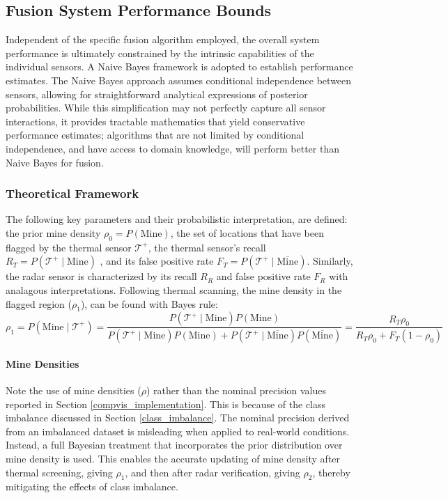 \subsection{Fusion System Performance Bounds}\label{fusion_bounds}

    Independent of the specific fusion algorithm employed, the overall system performance is ultimately constrained by the intrinsic capabilities of the individual sensors. A Naive Bayes framework is adopted to establish performance estimates. The Naive Bayes approach assumes conditional independence between sensors, allowing for straightforward analytical expressions of posterior probabilities. While this simplification may not perfectly capture all sensor interactions, it provides tractable mathematics that yield conservative performance estimates; algorithms that are not limited by conditional independence, and have access to domain knowledge, will perform better than Naive Bayes for fusion.

    \subsubsection{Theoretical Framework}
        
        The following key parameters and their probabilistic interpretation, are defined: the prior mine density $\rho_0 = P(\text{Mine})$, the set of locations that have been flagged by the thermal sensor \(\mathcal{T}^+\), the thermal sensor's recall $R_T = P(\mathcal{T}^+\mid\text{Mine})$ , and its false positive rate $F_T = P(\mathcal{T}^+ \mid \overline{\text{Mine}})$. Similarly, the radar sensor is characterized by its recall $R_R$ and false positive rate $F_R$ with analagous interpretations. Following thermal scanning, the mine density in the flagged region ($\rho_1$), can be found with Bayes rule:
        \begin{equation}
        \rho_1 = P(\text{Mine} \mid \mathcal{T}^+) =\frac{P(\mathcal{T}^+\mid\text{Mine})P(\text{Mine})}{P(\mathcal{T}^+\mid\text{Mine})P(\text{Mine})+ P(\mathcal{T}^+\mid \overline{\text{Mine}})P(\overline{\text{Mine}})} =\frac{R_T \rho_0}{R_T \rho_0 + F_T (1 - \rho_0)}
        \end{equation}
        
        \paragraph{Mine Densities} 
        

            Note the use of mine densities (\(\rho\)) rather than the nominal precision values reported in Section \ref{compvis_implementation}. This is because of the class imbalance discussed in Section \ref{class_imbalance}. The nominal precision derived from an imbalanced dataset is misleading when applied to real-world conditions. Instead, a full Bayesian treatment that incorporates the prior distribution over mine density is used. This enables the accurate updating of mine density after thermal screening, giving \(\rho_1\), and then after radar verification, giving \(\rho_2\), thereby mitigating the effects of class imbalance.

